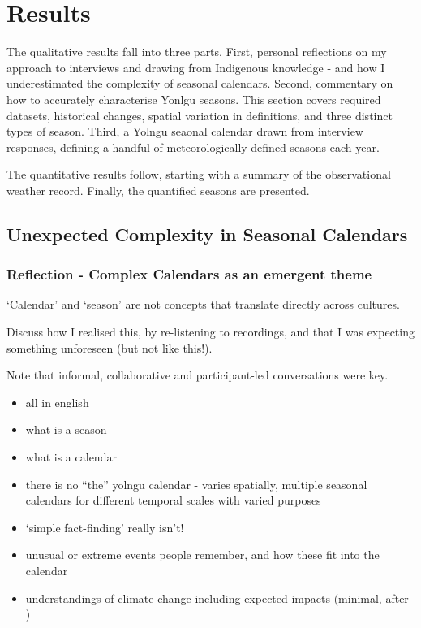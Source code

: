 \chapter{Results}
\label{ch:results}

The qualitative results fall into three parts.
%
First, personal reflections on my approach to interviews and drawing
from Indigenous knowledge - and how I underestimated the complexity
of seasonal calendars.
%
Second, commentary on how to accurately characterise Yonlgu seasons.
This section covers required datasets, historical changes, spatial
variation in definitions, and three distinct types of season.
%
Third, a Yolngu seaonal calendar drawn from interview responses,
defining a handful of meteorologically-defined seasons each year.

The quantitative results follow, starting with a summary of the
observational weather record.  Finally, the quantified seasons are
presented.



\section{Unexpected Complexity in Seasonal Calendars}
\label{sec:complex-seasons}



\subsection{Reflection - Complex Calendars as an emergent theme}

`Calendar' and `season' are not concepts that translate directly across cultures.

Discuss how I realised this, by re-listening to recordings, and that I was
expecting something unforeseen (but not like this!).

Note that informal, collaborative and participant-led conversations were key.


\begin{itemize}
\item all in english
\item what is a season
\item what is a calendar
\item there is no ``the'' yolngu calendar - varies spatially,
        multiple seasonal calendars for different temporal scales with varied purposes
\item `simple fact-finding' really isn't!
\item unusual or extreme events people remember, and how these fit into the calendar
\item understandings of climate change including expected impacts (minimal, after \citet{petheram2010})
\end{itemize}



